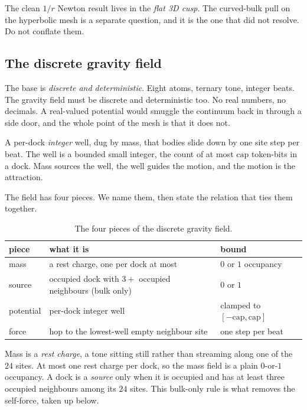 The clean $1/r$ Newton result lives in the \emph{flat 3D cusp}. The curved-bulk pull on the hyperbolic mesh is a separate question, and it is the one that did not resolve. Do not conflate them.

\subsection{The discrete gravity field}

The base is \emph{discrete and deterministic}. Eight atoms, ternary tone, integer beats. The gravity field must be discrete and deterministic too. No real numbers, no decimals. A real-valued potential would smuggle the continuum back in through a side door, and the whole point of the mesh is that it does not.

\begin{definition}
A per-dock \emph{integer} well, dug by mass, that bodies slide down by one site step per beat. The well is a bounded small integer, the count of at most $\mathrm{cap}$ token-bits in a dock. Mass sources the well, the well guides the motion, and the motion is the attraction.
\end{definition}

The field has four pieces. We name them, then state the relation that ties them together.

\begin{table}[ht]
\centering
\begin{tabular}{@{}lll@{}}
\toprule
piece & what it is & bound \\
\midrule
mass & a rest charge, one per dock at most & $0$ or $1$ occupancy \\
source & occupied dock with $3+$ occupied neighbours (bulk only) & $0$ or $1$ \\
potential & per-dock integer well & clamped to $[-\mathrm{cap}, \mathrm{cap}]$ \\
force & hop to the lowest-well empty neighbour site & one step per beat \\
\bottomrule
\end{tabular}
\caption{The four pieces of the discrete gravity field.}
\label{tab:gravity-pieces}
\end{table}

Mass is a \emph{rest charge}, a tone sitting still rather than streaming along one of the $24$ sites. At most one rest charge per dock, so the mass field is a plain $0$-or-$1$ occupancy. A dock is a \emph{source} only when it is occupied and has at least three occupied neighbours among its $24$ sites. This bulk-only rule is what removes the self-force, taken up below.

